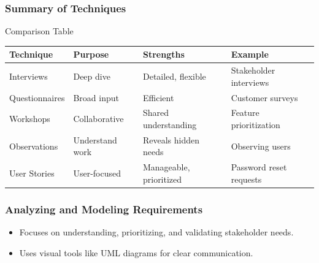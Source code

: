 \documentclass{beamer}
\begin{document}
\begin{frame}[fragile]
  \frametitle{Summary of Techniques}
  \begin{block}{Comparison Table}
    \begin{tabular}{|l|l|l|l|}
      \hline
      Technique & Purpose & Strengths & Example \\
      \hline
      Interviews & Deep dive & Detailed, flexible & Stakeholder interviews \\
      Questionnaires & Broad input & Efficient & Customer surveys \\
      Workshops & Collaborative & Shared understanding & Feature prioritization \\
      Observations & Understand work & Reveals hidden needs & Observing users \\
      User Stories & User-focused & Manageable, prioritized & Password reset requests \\
      \hline
    \end{tabular}
  \end{block}
\end{frame}

\begin{frame}[fragile]
    \frametitle{Analyzing and Modeling Requirements}
    \begin{itemize}
        \item Focuses on understanding, prioritizing, and validating stakeholder needs.
        \item Uses visual tools like UML diagrams for clear communication.
    \end{itemize}
\end{frame}
\end{document}

